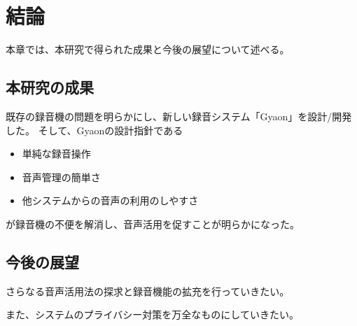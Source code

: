 \chapter{結論}
\label{chap:conclusion}

本章では、本研究で得られた成果と今後の展望について述べる。

\newpage

\section{本研究の成果}

既存の録音機の問題を明らかにし、新しい録音システム「Gyaon」を設計/開発した。
そして、Gyaonの設計指針である

\begin{itemize}
\item 単純な録音操作
\item 音声管理の簡単さ
\item 他システムからの音声の利用のしやすさ
\end{itemize}

が録音機の不便を解消し、音声活用を促すことが明らかになった。

\section{今後の展望}

さらなる音声活用法の探求と録音機能の拡充を行っていきたい。

また、システムのプライバシー対策を万全なものにしていきたい。
